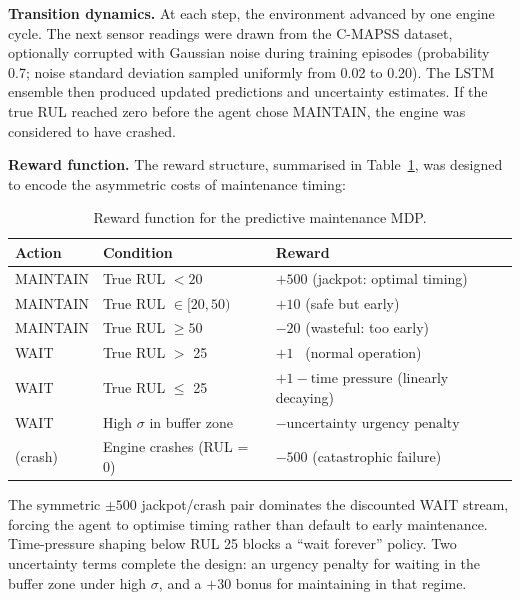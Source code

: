\documentclass[12pt,a4paper]{report}
\begin{document}
\textbf{Transition dynamics.} At each step, the environment advanced by one engine cycle. The next sensor readings were drawn from the C-MAPSS dataset, optionally corrupted with Gaussian noise during training episodes (probability 0.7; noise standard deviation sampled uniformly from 0.02 to 0.20). The LSTM ensemble then produced updated predictions and uncertainty estimates. If the true RUL reached zero before the agent chose MAINTAIN, the engine was considered to have crashed.


\textbf{Reward function.} The reward structure, summarised in Table~\ref{tab:reward}, was designed to encode the asymmetric costs of maintenance timing:

\begin{table}[h]
\centering
\caption{Reward function for the predictive maintenance MDP.}
\label{tab:reward}
\renewcommand{\arraystretch}{1.3}
\begin{tabular}{>{\raggedright\arraybackslash}p{2.5cm} >{\raggedright\arraybackslash}p{3cm} >{\raggedright\arraybackslash}p{7cm}}
\toprule
\textbf{Action} & \textbf{Condition} & \textbf{Reward} \\
\midrule
MAINTAIN & True RUL $< 20$ & $+500$ \quad (jackpot: optimal timing) \\
MAINTAIN & True RUL $\in [20, 50)$ & $+10$ \quad\;\; (safe but early) \\
MAINTAIN & True RUL $\geq 50$ & $-20$ \quad\;\; (wasteful: too early) \\
\addlinespace
WAIT & True RUL $>$ 25 & $+1$ \quad\;\;\;\, (normal operation) \\
WAIT & True RUL $\leq$ 25 & $+1 - \text{time pressure}$ \quad (linearly decaying) \\
WAIT & High $\sigma$ in buffer zone & $-\text{uncertainty urgency penalty}$ \\
\addlinespace
(crash) & Engine crashes (RUL = 0) & $-500$ \quad (catastrophic failure) \\
\bottomrule
\end{tabular}
\end{table}


The symmetric $\pm 500$ jackpot/crash pair dominates the discounted WAIT stream, forcing the agent to optimise timing rather than default to early maintenance. Time-pressure shaping below RUL 25 blocks a ``wait forever'' policy. Two uncertainty terms complete the design: an urgency penalty for waiting in the buffer zone under high $\sigma$, and a $+30$ bonus for maintaining in that regime.
\end{document}
